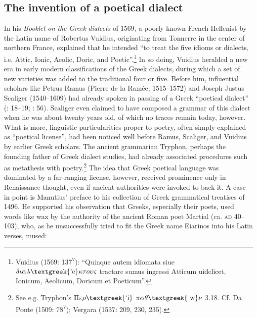 \subsection{The invention of a poetical dialect}
\hypertarget{Toc19704813}{}
In his \textit{Booklet} \textit{on} \textit{the} \textit{Greek} \textit{dialects} of 1569, a poorly known French Hellenist by the Latin name of Robertus Vuidius, originating from Tonnerre in the center of northern France, explained that he intended “to treat the five idioms or dialects, i.e. Attic, Ionic, Aeolic, Doric, and Poetic”.\footnote{Vuidius (1569: 137\textsc{\textsuperscript{v}}): “Quinque autem idiomata siue $\delta \iota \alpha \lambda \text{\textgreek{'e}}\kappa \tau o\upsilon \varsigma $ tractare sumus ingressi Atticum uidelicet, Ionicum, Aeolicum, Doricum et Poeticum”.} In so doing, Vuidius heralded a new era in early modern classifications of the Greek dialects, during which a set of new varieties was added to the traditional four or five. Before him, influential scholars like Petrus Ramus (Pierre de la Ramée; 1515–1572) and Joseph Justus Scaliger (1540–1609) had already spoken in passing of a Greek “poetical dialect” (\citealt{Ramus1560}: 18–19; \citealt{Scaliger1594}: 56). Scaliger even claimed to have composed a grammar of this dialect when he was about twenty years old, of which no traces remain today, however. What is more, linguistic particularities proper to poetry, often simply explained as “poetical license”, had been noticed well before Ramus, Scaliger, and Vuidius by earlier Greek scholars. The ancient grammarian Tryphon, perhaps the founding father of Greek dialect studies, had already associated procedures such as metathesis with poetry.\footnote{See e.g. Tryphon’s $\Pi \varepsilon \rho \text{\textgreek{`i}}$ $\pi \alpha \theta \text{\textgreek{~w}}\nu $ 3.18. Cf. Da Ponte (1509: 78\textsc{\textsuperscript{v}}); Vergara (1537: 209, 230, 235).} The idea that Greek poetical language was dominated by a far-ranging license, however, received prominence only in Renaissance thought, even if ancient authorities were invoked to back it. A case in point is Manutius’ preface to his collection of Greek grammatical treatises of 1496. He supported his observation that Greeks, especially their poets, used words like wax by the authority of the ancient Roman poet Martial (ca. \textsc{ad} 40–103), who, as he unsuccessfully tried to fit the Greek name Eiarinos into his Latin verses, mused:


